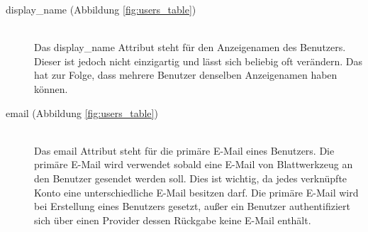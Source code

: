 \begin{description}
	\item[display\_name (Abbildung \ref{fig:users_table})]\hfill\\
	Das display\_name Attribut steht für den Anzeigenamen des Benutzers. Dieser ist jedoch nicht einzigartig und lässt sich beliebig oft verändern. Das hat zur Folge, dass mehrere Benutzer denselben Anzeigenamen haben können.
	\item[email (Abbildung \ref{fig:users_table})]\hfill\\
	Das email Attribut steht für die primäre E-Mail eines Benutzers. Die primäre E-Mail wird verwendet sobald eine E-Mail von Blattwerkzeug an den Benutzer gesendet werden soll. Dies ist wichtig, da jedes verknüpfte Konto eine unterschiedliche E-Mail besitzen darf. Die primäre E-Mail wird bei Erstellung eines Benutzers gesetzt, außer ein Benutzer authentifiziert sich über einen Provider dessen Rückgabe keine E-Mail enthält.
\end{description}

